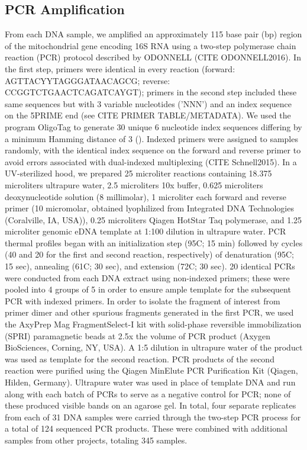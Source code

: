 \documentclass[11pt,letterpaper]{article} %
\begin{document}
\subsection*{PCR Amplification}

From each DNA sample, we amplified an approximately 115 base pair (bp) region of the mitochondrial gene encoding 16S RNA using a two-step polymerase chain reaction (PCR) protocol described by ODONNELL (CITE ODONNELL2016).
In the first step, primers were identical in every reaction (forward: AGTTACYYTAGGGATAACAGCG; reverse: CCGGTCTGAACTCAGATCAYGT); primers in the second step included these same sequences but with 3 variable nucleotides ('NNN') and an index sequence on the 5PRIME end (see CITE PRIMER TABLE/METADATA).
We used the program OligoTag \cite{Coissac2012} to generate 30 unique 6 nucleotide index sequences differing by a minimum Hamming distance of 3 ().
Indexed primers were assigned to samples randomly, with the identical index sequence on the forward and reverse primer to avoid errors associated with dual-indexed multiplexing (CITE Schnell2015).
In a UV-sterilized hood, we prepared 25 microliter reactions containing 18.375 microliters ultrapure water, 2.5 microliters 10x buffer, 0.625 microliters deoxynucleotide solution (8 millimolar), 1 microliter each forward and reverse primer (10 micromolar, obtained lyophilized from Integrated DNA Technologies (Coralville, IA, USA)), 0.25 microliters Qiagen HotStar Taq polymerase, and 1.25 microliter genomic eDNA template at 1:100 dilution in ultrapure water.
PCR thermal profiles began with an initialization step (95C; 15 min) followed by cycles (40 and 20 for the first and second reaction, respectively) of denaturation (95C; 15 sec), annealing (61C; 30 sec), and extension (72C; 30 sec).
20 identical PCRs were conducted from each DNA extract using non-indexed primers; these were pooled into 4 groups of 5 in order to ensure ample template for the subsequent PCR with indexed primers. %
In order to isolate the fragment of interest from primer dimer and other spurious fragments generated in the first PCR, we used the AxyPrep Mag FragmentSelect-I kit with solid-phase reversible immobilization (SPRI) paramagnetic beads at 2.5x the volume of PCR product (Axygen BioSciences, Corning, NY, USA).
A 1:5 dilution in ultrapure water of the product was used as template for the second reaction.
PCR products of the second reaction were purified using the Qiagen MinElute PCR Purification Kit (Qiagen, Hilden, Germany).
Ultrapure water was used in place of template DNA and run along with each batch of PCRs to serve as a negative control for PCR; none of these produced visible bands on an agarose gel.
In total, four separate replicates from each of 31 DNA samples were carried through the two-step PCR process for a total of 124 sequenced PCR products.
These were combined with additional samples from other projects, totaling 345 samples.
\end{document}
